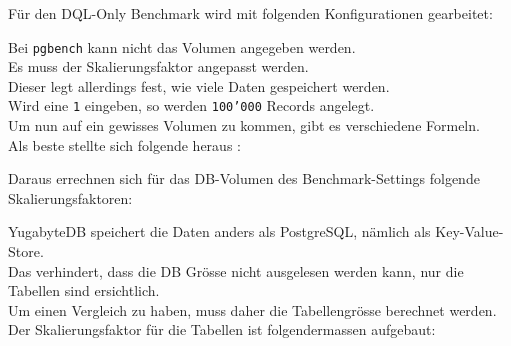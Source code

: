 \begin{flushleft}
    Für den DQL-Only Benchmark wird mit folgenden Konfigurationen gearbeitet:
    
\end{flushleft}
\begin{flushleft}
    Bei \texttt{pgbench} kann nicht das Volumen angegeben werden.\\
    Es muss der Skalierungsfaktor angepasst werden.\\
    Dieser legt allerdings fest, wie viele Daten gespeichert werden.\\
    Wird eine \texttt{1} eingeben, so werden \texttt{100'000} Records angelegt.\\

    Um nun auf ein gewisses Volumen zu kommen, gibt es verschiedene Formeln.\\
    Als beste stellte sich folgende heraus \cite{DKXU3QRC}:\\
    
\end{flushleft}
\begin{flushleft}
    Daraus errechnen sich für das DB-Volumen des Benchmark-Settings folgende Skalierungsfaktoren:\\
    
\end{flushleft}
\begin{flushleft}
    YugabyteDB speichert die Daten anders als PostgreSQL, nämlich als \Gls{Key-Value-Store}.\\
    Das verhindert, dass die DB Grösse nicht ausgelesen werden kann, nur die Tabellen sind ersichtlich.\\
    Um einen Vergleich zu haben, muss daher die Tabellengrösse berechnet werden.\\
    Der Skalierungsfaktor für die Tabellen ist folgendermassen aufgebaut:\\
    
\end{flushleft}
